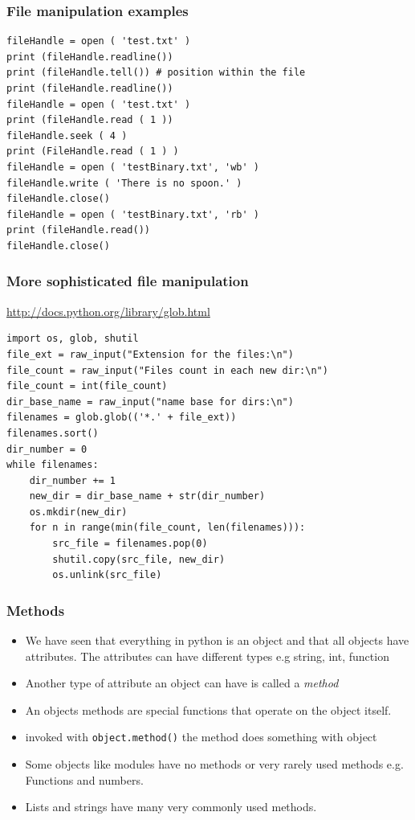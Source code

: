 \documentclass{beamer}
\begin{document}
\begin{frame}[containsverbatim]
\frametitle{File manipulation examples}
\begin{lstlisting}
fileHandle = open ( 'test.txt' )
print (fileHandle.readline()) 
print (fileHandle.tell()) # position within the file
print (fileHandle.readline())
fileHandle = open ( 'test.txt' )
print (fileHandle.read ( 1 ))
fileHandle.seek ( 4 )
print (FileHandle.read ( 1 ) )
fileHandle = open ( 'testBinary.txt', 'wb' )
fileHandle.write ( 'There is no spoon.' )
fileHandle.close()
fileHandle = open ( 'testBinary.txt', 'rb' )
print (fileHandle.read())
fileHandle.close() 
\end{lstlisting}
\end{frame}

\begin{frame}[containsverbatim]
\frametitle{More sophisticated file manipulation}
\url{http://docs.python.org/library/glob.html}
\begin{lstlisting}
import os, glob, shutil
file_ext = raw_input("Extension for the files:\n")
file_count = raw_input("Files count in each new dir:\n")
file_count = int(file_count)
dir_base_name = raw_input("name base for dirs:\n")
filenames = glob.glob(('*.' + file_ext))
filenames.sort()
dir_number = 0
while filenames:
    dir_number += 1
    new_dir = dir_base_name + str(dir_number)
    os.mkdir(new_dir)
    for n in range(min(file_count, len(filenames))):
        src_file = filenames.pop(0)
        shutil.copy(src_file, new_dir)
        os.unlink(src_file)
\end{lstlisting}
\end{frame}

\begin{frame}
\frametitle{Methods}
\begin{itemize}
\item We have seen that everything in python is an object and that all objects have attributes. The attributes can have different types e.g string, int, function
\item Another type of attribute an object can have is called a {\em method}
\item An objects methods are special functions that operate on the object itself. 
\item invoked with \texttt{object.method()} the method does something with object
\item Some objects like modules have no methods or very rarely used methods e.g. Functions and numbers.
\item Lists and strings have many very commonly used methods.
\end{itemize}
\end{frame}
\end{document}
